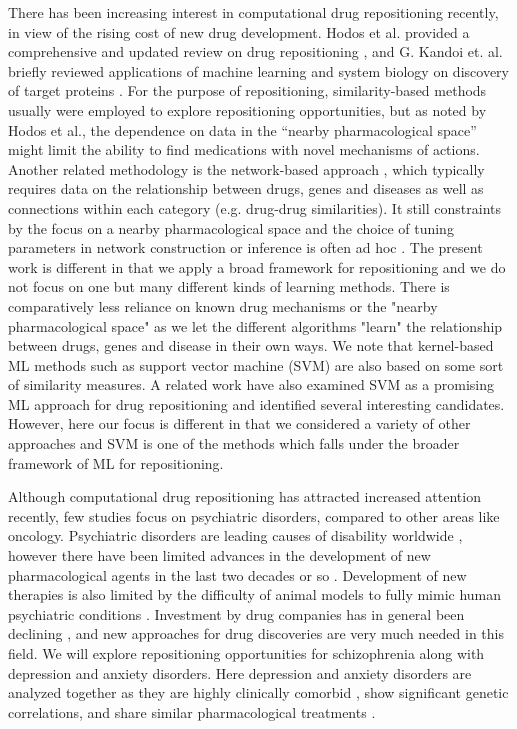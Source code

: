     There has been increasing interest in computational drug repositioning recently, in view of the rising cost of new drug development. Hodos et al. provided a comprehensive and updated review on drug repositioning \cite{hodos2016silico}, and G. Kandoi et. al. briefly reviewed applications of machine learning and system biology on discovery of target proteins \cite{kandoi2015prediction}. For the purpose of repositioning, similarity-based methods \cite{gottlieb2011predict,oh2014network,liu2015similarity,luo2016drug,napolitano2013drug,li2012new} usually were employed to explore repositioning opportunities, but as noted by Hodos et al., the dependence on data in the “nearby pharmacological space” might limit the ability to find medications with novel mechanisms of actions. Another related methodology is the network-based approach \cite{lotfi2018review}, which typically requires data on the relationship between drugs, genes and diseases as well as connections within each category (e.g. drug-drug similarities). It still constraints by the focus on a nearby pharmacological space and the choice of tuning parameters in network construction or inference is often ad hoc \cite{ferrero2017silico}. The present work is different in that we apply a broad framework for repositioning and we do not focus on one but many different kinds of learning methods. There is comparatively less reliance on known drug mechanisms or the "nearby pharmacological space" as we let the different algorithms "learn" the relationship between drugs, genes and disease in their own ways. We note that kernel-based ML methods such as support vector machine (SVM) are also based on some sort of similarity measures. A related work \cite{napolitano2013drug} have also examined SVM as a promising ML approach for drug repositioning and identified several interesting candidates. However, here our focus is different in that we considered a variety of other approaches and SVM is one of the methods which falls under the broader framework of ML for repositioning. 

    Although computational drug repositioning has attracted increased attention recently, few studies focus on psychiatric disorders, compared to other areas like oncology. Psychiatric disorders are leading causes of disability worldwide \cite{vigo2016estimating}, however there have been limited advances in the development of new pharmacological agents in the last two decades or so \cite{hyman2013psychiatric}. Development of new therapies is also limited by the difficulty of animal models to fully mimic human psychiatric conditions \cite{nestler2010animal}. Investment by drug companies has in general been declining \cite{hyman2013psychiatric} , and new approaches for drug discoveries are very much needed in this field. We will explore repositioning opportunities for schizophrenia along with depression and anxiety disorders. Here depression and anxiety disorders are analyzed together as they are highly clinically comorbid \cite{kessler2015anxious,otowa2016meta}, show significant genetic correlations\cite{otowa2016meta}, and share similar pharmacological treatments \cite{ballenger2000anxiety}.
  
